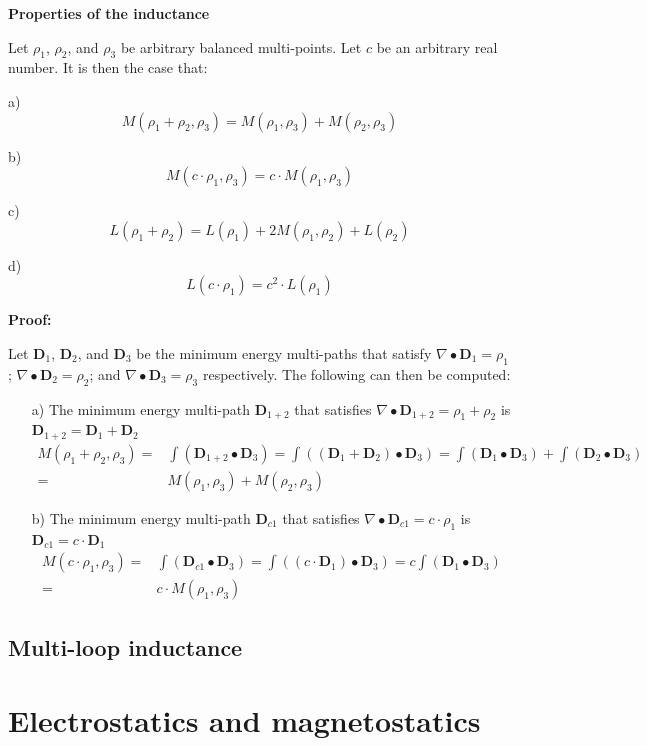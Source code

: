 \vspace{5mm}

\textbf{Properties of the inductance}

\begin{thm}\label{thm:balanced_multi-point_inductance_properties}
Let \(\rho_1\), \(\rho_2\), and \(\rho_3\) be arbitrary balanced multi-points. Let \(c\) be an arbitrary real number. It is then the case that:

a)
\[M(\rho_1 + \rho_2, \rho_3) = M(\rho_1, \rho_3) + M(\rho_2, \rho_3)\]

b)
\[M(c \cdot \rho_1, \rho_3) = c \cdot M(\rho_1, \rho_3)\]

c)
\[L(\rho_1 + \rho_2) = L(\rho_1) + 2M(\rho_1, \rho_2) + L(\rho_2)\]

d)
\[L(c \cdot \rho_1) = c^2 \cdot L(\rho_1)\]
\end{thm}
\textbf{Proof:}

Let \(\mathbf{D}_1\), \(\mathbf{D}_2\), and \(\mathbf{D}_3\) be the minimum energy multi-paths that satisfy \(\nabla \bullet \mathbf{D}_1 = \rho_1\); \(\nabla \bullet \mathbf{D}_2 = \rho_2\); and \(\nabla \bullet \mathbf{D}_3 = \rho_3\) respectively. The following can then be computed:

\begin{itemize}
\item[a)]
The minimum energy multi-path \(\mathbf{D}_{1+2}\) that satisfies \(\nabla \bullet \mathbf{D}_{1+2} = \rho_1 + \rho_2\) is \(\mathbf{D}_{1+2} = \mathbf{D}_1 + \mathbf{D}_2\)
\begin{align*}
M(\rho_1 + \rho_2, \rho_3) = & \int (\mathbf{D}_{1+2} \bullet \mathbf{D}_3) = \int ((\mathbf{D}_1 + \mathbf{D}_2) \bullet \mathbf{D}_3) = \int (\mathbf{D}_1 \bullet \mathbf{D}_3) + \int (\mathbf{D}_2 \bullet \mathbf{D}_3) \\
= & M(\rho_1, \rho_3) + M(\rho_2, \rho_3)
\end{align*} 
\item[b)]
The minimum energy multi-path \(\mathbf{D}_{c1}\) that satisfies \(\nabla \bullet \mathbf{D}_{c1} = c \cdot \rho_1\) is \(\mathbf{D}_{c1} = c \cdot \mathbf{D}_1\)
\begin{align*}
M(c \cdot \rho_1, \rho_3) = & \int (\mathbf{D}_{c1} \bullet \mathbf{D}_3) = \int ((c \cdot \mathbf{D}_1) \bullet \mathbf{D}_3) = c\int (\mathbf{D}_1 \bullet \mathbf{D}_3) \\
= & c \cdot M(\rho_1, \rho_3)
\end{align*} 
\end{itemize}   



\subsection{Multi-loop inductance}



\section{Electrostatics and magnetostatics}








